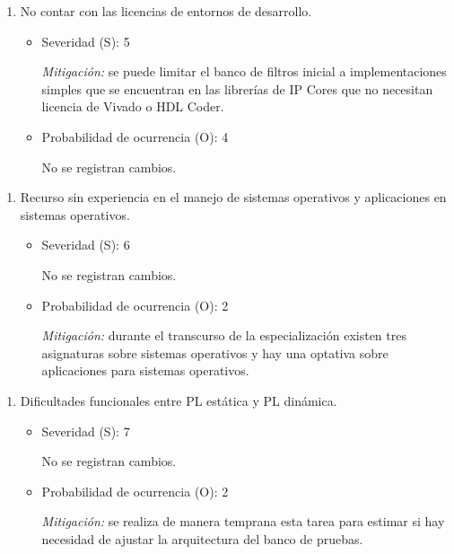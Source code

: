\documentclass[
11pt, %
]{charter}
\begin{document}
\begin{enumerate}[]
	\begin{enumerate}[$\text{Riesgo}$ 3:, leftmargin=*,align=left]

		\item No contar con las licencias de entornos de desarrollo.
		\begin{itemize}
			\item Severidad (S): 5
			
			\emph{Mitigación:} se puede limitar el banco de filtros inicial a implementaciones simples que se encuentran en las librerías de IP Cores que no necesitan licencia de Vivado o HDL Coder.
			\item Probabilidad de ocurrencia (O): 4
			
			No se registran cambios.
		\end{itemize}
	\end{enumerate}

	\begin{enumerate}[$\text{Riesgo}$ 4:, leftmargin=*,align=left]

		\item Recurso sin experiencia en el manejo de sistemas operativos y aplicaciones en sistemas operativos.
		\begin{itemize}
			\item Severidad (S): 6
			
			No se registran cambios.
			\item Probabilidad de ocurrencia (O): 2
			
			\emph{Mitigación:} durante el transcurso de la especialización existen tres asignaturas sobre sistemas operativos y hay una optativa sobre aplicaciones para sistemas operativos.
		\end{itemize}
	\end{enumerate}

	\begin{enumerate}[$\text{Riesgo}$ 5:, leftmargin=*,align=left]

		\item Dificultades funcionales entre PL estática y PL dinámica.
		\begin{itemize}
			\item Severidad (S): 7
			
			No se registran cambios.
			\item Probabilidad de ocurrencia (O): 2
			
			\emph{Mitigación:} se realiza de manera temprana esta tarea para estimar si hay necesidad de ajustar la arquitectura del banco de pruebas.
			

\end{itemize}
\end{enumerate}
\end{enumerate}
\end{document}
